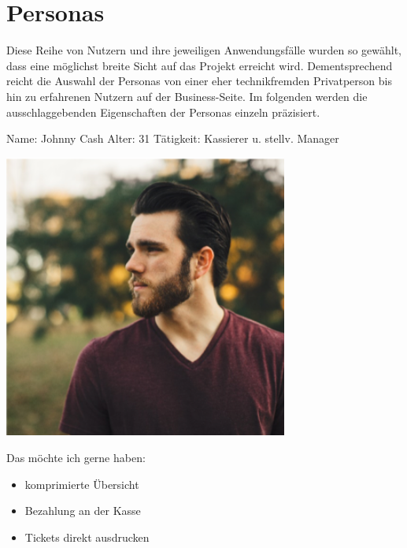 \section{Personas}
\authorsection{\authorGP}
Diese Reihe von Nutzern und ihre jeweiligen Anwendungsfälle wurden so gewählt, dass eine möglichst breite Sicht auf das Projekt erreicht wird.
Dementsprechend reicht die Auswahl der Personas von einer eher technikfremden Privatperson bis hin zu erfahrenen Nutzern auf der Business-Seite.
Im folgenden werden die ausschlaggebenden Eigenschaften der Personas einzeln präzisiert.

\begin{minipage}[t]{0.5\textwidth} 	\vspace{0.2\baselineskip} %
	\begin{entrylist}
		\entry
		{Name:}
		{Johnny Cash}
			\entry
		{Alter:}
		{31}
		\entry
		{Tätigkeit:}
		{Kassierer u. stellv. Manager}
	\end{entrylist}
	\begin{barchart}{5.0}\hspace{-1mm}
	\end{barchart}
\end{minipage}
\hfil
\begin{minipage}[t]{0.4\textwidth} 	\vspace{0.0\baselineskip} %
	\flushright
	\includegraphics[width=0.70\textwidth]{img/personas/johnny}
\end{minipage}

Das möchte ich gerne haben:
\begin{itemize}
	\item komprimierte Übersicht
	\item Bezahlung an der Kasse
	\item Tickets direkt ausdrucken
\end{itemize}


